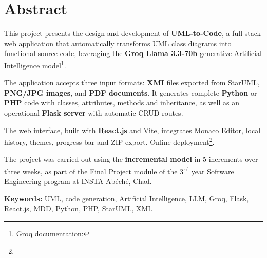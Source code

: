 \chapter*{Abstract}

This project presents the design and development of \textbf{UML-to-Code}, a full-stack web application that automatically transforms UML class diagrams into functional source code, leveraging the \textbf{Groq Llama 3.3-70b} generative Artificial Intelligence model\footnote{Groq documentation: }.

The application accepts three input formats: \textbf{XMI} files exported from StarUML, \textbf{PNG/JPG images}, and \textbf{PDF documents}. It generates complete \textbf{Python} or \textbf{PHP} code with classes, attributes, methods and inheritance, as well as an operational \textbf{Flask server} with automatic CRUD routes.

The web interface, built with \textbf{React.js} and Vite, integrates Monaco Editor, local history, themes, progress bar and ZIP export. Online deployment\footnote{}.

The project was carried out using the \textbf{incremental model} in 5 increments over three weeks, as part of the Final Project module of the 3\textsuperscript{rd} year Software Engineering program at INSTA Abéché, Chad.

\noindent\textbf{Keywords:} UML, code generation, Artificial Intelligence, LLM, Groq, Flask, React.js, MDD, Python, PHP, StarUML, XMI.

\clearpage
